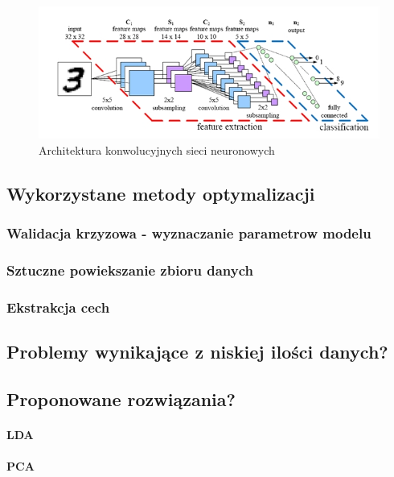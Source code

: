 \begin{figure}[ht!]
\centering
\includegraphics[scale=0.75]{res/cnn3.jpg}
\caption[Caption for LOF]{Architektura konwolucyjnych sieci neuronowych\footnotemark\label{cnn3}} 
\end{figure}

\subsection{Wykorzystane metody optymalizacji}
\subsubsection{Walidacja krzyzowa - wyznaczanie parametrow modelu}
\subsubsection{Sztuczne powiekszanie zbioru danych}
\subsubsection{Ekstrakcja cech}
\subsection{Problemy wynikające z niskiej ilości danych?}\label{problems}
\subsection{Proponowane rozwiązania?}
\paragraph{LDA}
\paragraph{PCA}


